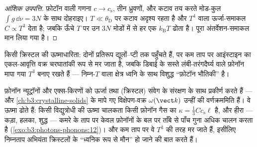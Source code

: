 \begin{proof}[आंशिक उपपत्ति]
फ़ोटॉन वाली गणना $c \to c_{\text{s}}$, तीन
ध्रुवणों, और कटाव तय करते मोड-कुल $\int g\,\dd\nu = 3N$ के साथ
दोहराइए। $T \ll \theta_{\text{D}}$ पर कटाव अदृश्य रहता है और
$T^4$ वाला ऊर्जा-समाकल $C \propto T^3$ देता है; जबकि ऊँचे $T$ पर
उन $3N$ मोडों में से हर एक $k_{\text{B}}T$ ढोता है। पूरा
अंतर्वेशन-समाकल मान लिया गया है।
\end{proof}

\begin{omfigure}

{\small किसी क्रिस्टल की ऊष्माधारिता: दोनों प्रतिरूप
द्यूलों--प्टी तक पहुँचते हैं, पर कम ताप पर आइंस्टाइन का
एकल-आवृत्ति वक्र चरघातांकी रूप से मर जाता है, जबकि डिबाई के सस्ते
लंबी-तरंगदैर्घ्य वाले फ़ोनॉन मापा गया $T^3$ बनाए रखते हैं --- निम्न-$T$
वाला क्षेत्र ध्वनि के साथ विशुद्ध ``फ़ोटॉन भौतिकी'' है।}
\end{omfigure}

\begin{example}[फ़ोनॉन असली कण हैं]\label{ex:b3:photons-phonons:phonon-real}
फ़ोनॉन न्यूट्रॉनों और एक्स-किरणों को ऊर्जा तथा (क्रिस्टल) संवेग के
संरक्षण के साथ प्रकीर्ण करते हैं --- और
\cref{ch:b3:crystalline-solids} के मापे गए विक्षेपण-वक्र
$\omega(\vect k)$ उन्हीं की वर्णक्रममिति हैं। वे ऊष्मा ढोते हैं:
किसी विद्युत्रोधी की ऊष्मा चालकता किसी फ़ोनॉन गैस का
$\kappa = \tfrac13 Cc_{\text{s}}\ell$ है, और
हीरा --- कड़ा, हलका, शुद्ध --- कमरे के ताप पर केवल फ़ोनॉनों के बल पर
ताँबे से पाँच गुना अधिक चालन करता है
(\cref{exo:b3:photons-phonons:12})। और कम ताप पर वे $T^3$ की तरह
मर जाते हैं, इसीलिए निम्नताप अभियंता क्रिस्टलों के ``ध्वनिक रूप से
मौन'' हो जाने की बात करते हैं।
\end{example}

